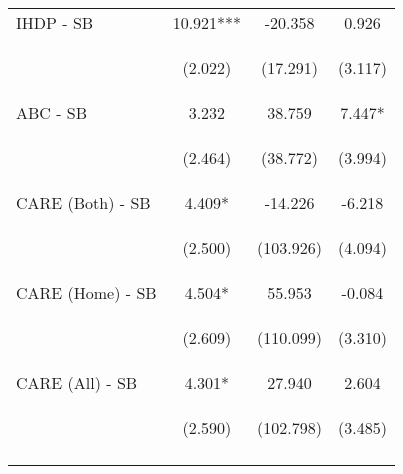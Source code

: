 \begin{tabular}{lccc}
\noalign{\smallskip}IHDP - SB & 10.921*** & -20.358 & 0.926\\
 & \begin{footnotesize}(2.022)\end{footnotesize} & \begin{footnotesize}(17.291)\end{footnotesize} & \begin{footnotesize}(3.117)\end{footnotesize}\\
\noalign{\smallskip}ABC - SB & 3.232 & 38.759 & 7.447*\\
 & \begin{footnotesize}(2.464)\end{footnotesize} & \begin{footnotesize}(38.772)\end{footnotesize} & \begin{footnotesize}(3.994)\end{footnotesize}\\
\noalign{\smallskip}CARE (Both) - SB & 4.409* & -14.226 & -6.218\\
 & \begin{footnotesize}(2.500)\end{footnotesize} & \begin{footnotesize}(103.926)\end{footnotesize} & \begin{footnotesize}(4.094)\end{footnotesize}\\
\noalign{\smallskip}CARE (Home) - SB & 4.504* & 55.953 & -0.084\\
 & \begin{footnotesize}(2.609)\end{footnotesize} & \begin{footnotesize}(110.099)\end{footnotesize} & \begin{footnotesize}(3.310)\end{footnotesize}\\
\noalign{\smallskip}CARE (All) - SB & 4.301* & 27.940 & 2.604\\
 & \begin{footnotesize}(2.590)\end{footnotesize} & \begin{footnotesize}(102.798)\end{footnotesize} & \begin{footnotesize}(3.485)\end{footnotesize}\\
\noalign{\smallskip}\hline\end{tabular}\\
